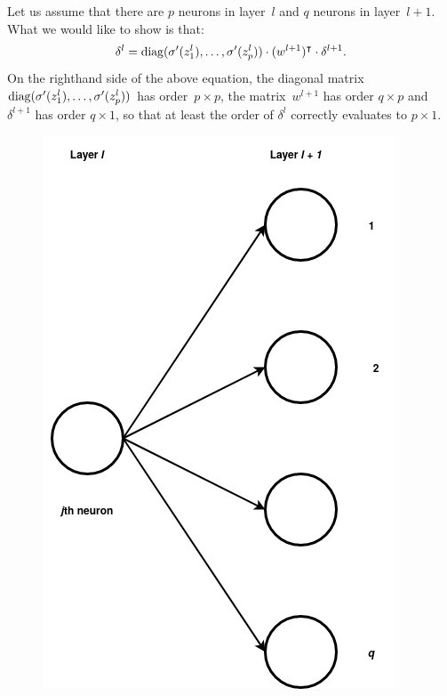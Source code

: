 Let us assume that there are $p$ neurons in layer~$l$ and $q$ neurons in layer~$l + 1$.
What we would like to show is that:
\begin{equation}
\label{eqn:backprop_error}
\delta^l = \operatorname{diag} (\sigma'(z_1^l), \ldots, \sigma'(z_p^l)) \cdot (w^{l + 1})^{\intercal} \cdot \delta^{l + 1}.
\end{equation}
On the righthand side of the above equation, the diagonal matrix
$\operatorname{diag} (\sigma'(z_1^l), \ldots, \sigma'(z_p^l))$ has order~$p \times p$, the
matrix~$w^{l + 1}$ has order $q \times p$ and $\delta^{l + 1}$ has order $q \times 1$,
so that at least the order of $\delta^{l}$ correctly evaluates to $p \times 1$.
\begin{figure}[ht]
\begin{center}
\includegraphics[scale=0.3]{twolayers.png}
\end{center}
\end{figure}


